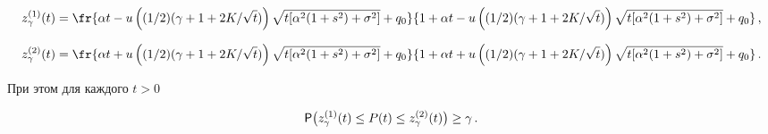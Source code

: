 $$


z^{(1)}_{\gamma}(t)=\fr{\alpha


t-u\left ((1/2)(\gamma+1+2K/\sqrt{t})\right)


\sqrt{t[\alpha^2(1+s^2)+\sigma^2]}+q_0}{1+\alpha


t-u\left((1/2)(\gamma+1+2K/\sqrt{t})\right)


\sqrt{t[\alpha^2(1+s^2)+\sigma^2]}+q_0}\,,


$$


$$


z^{(2)}_{\gamma}(t)=\fr{\alpha


t+u\left((1/2)(\gamma+1+2K/\sqrt{t})\right)


\sqrt{t[\alpha^2(1+s^2)+\sigma^2]}+q_0}{1+\alpha


t+u\left((1/2)(\gamma+1+2K/\sqrt{t})\right)


\sqrt{t[\alpha^2(1+s^2)+\sigma^2]}+q_0}\,.


$$








\noindent


При этом для каждого $t>0$


$$


{\sf P}\big(z^{(1)}_{\gamma}(t)\le P(t)\le


z^{(2)}_{\gamma}(t)\big)\ge\gamma\,.


$$


\pagebreak





